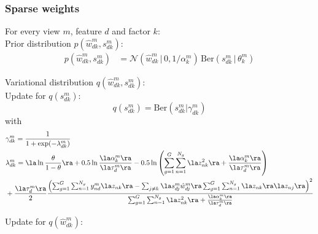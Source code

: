 

\subsubsection{Sparse weights}
For every view $m$, feature $d$ and factor $k$: \\

Prior distribution $p(\hat{w}_{dk}^m,s_{dk}^m)$:\\
\begin{align}
	p(\hat{w}_{dk}^m,s_{dk}^m) &= \mathcal{N} (\hat{w}_{dk}^m \,|\, 0, 1/\alpha_k^m)\, \text{Ber}(s_{dk}^m \,|\,\theta_k^m)
\end{align}

Variational distribution $q(\hat{w}_{dk}^m,s_{dk}^m)$:\\

Update for $q(s_{dk}^m)$:\\

\begin{equation}
	q(s^m_{dk}) = \mathrm{Ber}(s^m_{dk}|\gamma^m_{dk})
\end{equation}
with
\begin{equation} \begin{aligned}
	&\gamma^m_{dk} = \frac{1}{1+\exp(-\lambda_{dk}^m)}\\
	& \lambda_{dk}^m = \la \ln\frac{\theta}{1-\theta} \ra + 0.5\ln\frac{\la\alpha_k^m\ra}{\la\tau_d^m\ra} - 0.5\ln\left( \sum_{g=1}^G\sum_{n=1}^{N_g} \la z_{nk}^2 \ra + \frac{\la\alpha_k^m\ra}{\la\tau_d^m\ra} \right) \\
	&+ \frac{\la\tau_d^m\ra}{2} \frac{ \left( \sum_{g=1}^G\sum_{n=1}^{N_g} y_{nd}^m \la z_{nk} \ra - \sum_{j \neq k} \la s_{dj}^m\hat{w}_{dj}^m\ra \sum_{g=1}^G\sum_{n=1}^{N_g} \la z_{nk} \ra \la z_{nj} \ra \right)^2} {\sum_{g=1}^G\sum_{n=1}^{N_g} \la z_{nk}^2 \ra + \frac{\la\alpha_k^m\ra}{\la\tau_d^m\ra} }
\end{aligned} \end{equation}

Update for $q(\hat{w}_{dk}^m)$:\\

